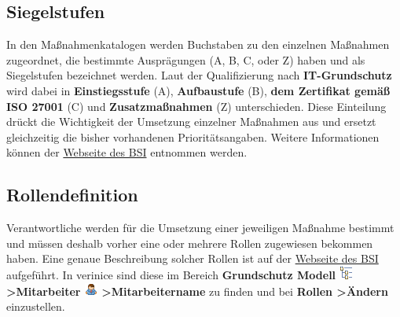 \documentclass[a4paper,10pt]{book}
\begin{document}
\subsection{Siegelstufen}
In den Maßnahmenkatalogen werden Buchstaben zu den einzelnen Maßnahmen zugeordnet, die bestimmte Ausprägungen (A, B, C, oder Z)
haben und als Siegelstufen bezeichnet werden. Laut der Qualifizierung nach \textbf{IT-Grundschutz} wird dabei in
\textbf{Einstiegsstufe} (A), \textbf{Aufbaustufe} (B), \textbf{dem Zertifikat gemäß ISO 27001} (C) und \textbf{Zusatzmaßnahmen} (Z) unterschieden.
Diese Einteilung drückt die Wichtigkeit der Umsetzung einzelner Maßnahmen aus und ersetzt gleichzeitig die bisher vorhandenen
Prioritätsangaben. Weitere Informationen können der
\href{https://www.bsi.bund.de/cln_156/DE/Themen/weitereThemen/ITGrundschutzSchulung/NeuesimITGrundschutz/LebenszyklusundSiegelstufen/lebenszyklusundsiegelstufen_node.html}{Webseite des BSI} entnommen werden.

\subsection{Rollendefinition}
Verantwortliche werden für die Umsetzung einer jeweiligen Maßnahme bestimmt und müssen deshalb vorher eine oder mehrere Rollen
zugewiesen bekommen haben. Eine genaue Beschreibung solcher Rollen ist auf der
\href{https://www.bsi.bund.de/cln_156/DE/Themen/weitereThemen/ITGrundschutzKataloge/Inhalt/Rollendefinitionen/rollendefinitionen_node.html}{Webseite des BSI} aufgeführt.
In verinice sind diese im Bereich \textbf{Grundschutz Modell \includegraphics[height=2ex]{Icon/GS_Modell.png} \textgreater Mitarbeiter \includegraphics[height=2ex]{Icon/Mitarbeiter.png} \textgreater  Mitarbeitername}
zu finden und bei \textbf{Rollen \textgreater Ändern} einzustellen.
\end{document}
